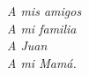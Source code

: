 \begin{dedication}
	\textit{
		A mis amigos\\
		A mi familia\\
		A Juan\\
		A mi Mamá.}
\end{dedication}